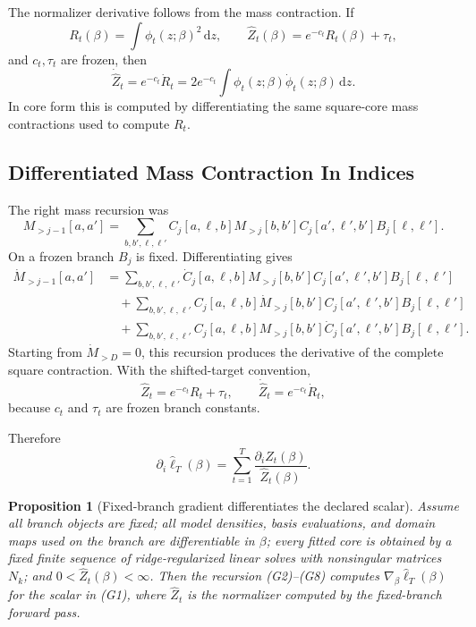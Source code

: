 \documentclass[11pt]{article}
\newtheorem{proposition}{Proposition}
\newcommand{\dd}{\,\mathrm d}
\begin{document}
The normalizer derivative follows from the mass contraction.  If
\[
    R_t(\beta)=\int \phi_t(z;\beta)^2\dd z,
    \qquad
    \widehat Z_t(\beta)=e^{-c_t}R_t(\beta)+\tau_t,
\]
and \(c_t,\tau_t\) are frozen, then
\[
    \dot{\widehat Z}_t=e^{-c_t}\dot R_t
    =
    2e^{-c_t}\int \phi_t(z;\beta)\dot\phi_t(z;\beta)\dd z.
    \tag{G7}
\]
In core form this is computed by differentiating the same square-core mass
contractions used to compute \(R_t\).

\subsection{Differentiated Mass Contraction In Indices}

The right mass recursion was
\[
    M_{>j-1}[a,a']
    =
    \sum_{b,b',\ell,\ell'}
    C_j[a,\ell,b]M_{>j}[b,b']C_j[a',\ell',b']B_j[\ell,\ell'].
\]
On a frozen branch \(B_j\) is fixed.  Differentiating gives
\[
\begin{aligned}
 \dot M_{>j-1}[a,a']
 &=
 \sum_{b,b',\ell,\ell'}
 \dot C_j[a,\ell,b]M_{>j}[b,b']C_j[a',\ell',b']B_j[\ell,\ell']\\
 &\quad+
 \sum_{b,b',\ell,\ell'}
 C_j[a,\ell,b]\dot M_{>j}[b,b']C_j[a',\ell',b']B_j[\ell,\ell']\\
 &\quad+
 \sum_{b,b',\ell,\ell'}
 C_j[a,\ell,b]M_{>j}[b,b']\dot C_j[a',\ell',b']B_j[\ell,\ell'].
\end{aligned}
\tag{G7a}
\]
Starting from \(\dot M_{>D}=0\), this recursion produces the derivative of the
complete square contraction.  With the shifted-target convention,
\[
    \widehat Z_t=e^{-c_t}R_t+\tau_t,
    \qquad
    \dot{\widehat Z}_t=e^{-c_t}\dot R_t,
    \tag{G7b}
\]
because \(c_t\) and \(\tau_t\) are frozen branch constants.

Therefore
\[
    \partial_i\widehat\ell_T(\beta)
    =
    \sum_{t=1}^T
    \frac{\partial_i\widehat Z_t(\beta)}
    {\widehat Z_t(\beta)}.
    \tag{G8}
\]

\begin{proposition}[Fixed-branch gradient differentiates the declared scalar]
Assume all branch objects are fixed; all model densities, basis evaluations, and
domain maps used on the branch are differentiable in \(\beta\); every fitted
core is obtained by a fixed finite sequence of ridge-regularized linear solves
with nonsingular matrices \(N_k\); and
\(0<\widehat Z_t(\beta)<\infty\).  Then the recursion (G2)--(G8) computes
\(\nabla_\beta\widehat\ell_T(\beta)\) for the scalar in (G1), where
\(\widehat Z_t\) is the normalizer computed by the fixed-branch forward pass.
\end{proposition}
\end{document}
